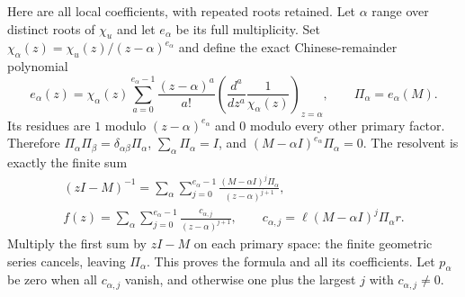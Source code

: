\documentclass[11pt]{article}
\begin{document}
Here are all local coefficients, with repeated roots retained.
Let $\alpha$ range over distinct roots of $\chi_u$ and let
$e_\alpha$ be its full multiplicity. Set
$\chi_{\alpha}(z)=\chi_u(z)/(z-\alpha)^{e_\alpha}$ and define
the exact Chinese-remainder polynomial
\begin{equation}\tag{NS14}\label{NS14}
e_\alpha(z)=\chi_\alpha(z)
\sum_{a=0}^{e_\alpha-1}
\frac{(z-\alpha)^a}{a!}
\left(\frac{d^a}{dz^a}\frac1{\chi_\alpha(z)}\right)_{z=\alpha},
\qquad \Pi_\alpha=e_\alpha(M).
\end{equation}
Its residues are $1$ modulo $(z-\alpha)^{e_\alpha}$ and
$0$ modulo every other primary factor. Therefore
$\Pi_\alpha\Pi_\beta=\delta_{\alpha\beta}\Pi_\alpha$,
$\sum_\alpha\Pi_\alpha=I$, and
$(M-\alpha I)^{e_\alpha}\Pi_\alpha=0$.
The resolvent is exactly the finite sum
\begin{equation}\tag{NS15}\label{NS15}
\begin{gathered}
(zI-M)^{-1}
 =\sum_\alpha\sum_{j=0}^{e_\alpha-1}
       \frac{(M-\alpha I)^j\Pi_\alpha}{(z-\alpha)^{j+1}},\\
f(z)=\sum_\alpha\sum_{j=0}^{e_\alpha-1}
       \frac{c_{\alpha,j}}{(z-\alpha)^{j+1}},\qquad
c_{\alpha,j}=\ell(M-\alpha I)^j\Pi_\alpha r .
\end{gathered}
\end{equation}
Multiply the first sum by $zI-M$ on each primary space:
the finite geometric series cancels, leaving $\Pi_\alpha$.
This proves the formula and all its coefficients.
Let $p_\alpha$ be zero when all $c_{\alpha,j}$ vanish,
and otherwise one plus the largest $j$ with
$c_{\alpha,j}\ne0$.
\end{document}
